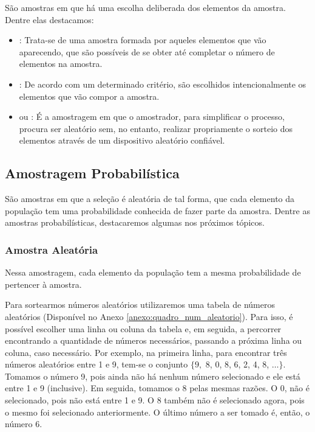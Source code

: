 \documentclass[11pt,fleqn]{book}
\numberwithin{mpicture}{chapter}
\numberwithin{mtable}{chapter}
\numberwithin{mframe}{chapter}
\begin{document}
São amostras em que há uma escolha deliberada dos elementos da amostra. Dentre elas destacamos:
\begin{itemize}
	\item {}: Trata-se de uma amostra formada por aqueles elementos que vão aparecendo, que são possíveis de se obter até completar o número de elementos na amostra.
	
	\item {}: De acordo com um determinado critério, são escolhidos intencionalmente os elementos que vão compor a amostra.
	
	\item {} ou : É a amostragem em que o amostrador, para simplificar o processo, procura ser aleatório sem, no entanto, realizar propriamente o sorteio dos elementos através de um dispositivo aleatório confiável.
\end{itemize}

\subsection{Amostragem Probabilística}

São amostras em que a seleção é aleatória de tal forma, que cada elemento da população tem uma probabilidade conhecida de fazer parte da amostra. Dentre as amostras probabilísticas, destacaremos algumas nos próximos tópicos.

\subsubsection{Amostra Aleatória}

Nessa amostragem, cada elemento da população tem a mesma probabilidade de pertencer à amostra.

Para sortearmos números aleatórios utilizaremos uma tabela de números aleatórios (Disponível no Anexo \ref{anexo:quadro_num_aleatorio}). Para isso, é possível escolher uma linha ou coluna da tabela e, em seguida, a percorrer encontrando a quantidade de números necessários, passando a próxima linha ou coluna, caso necessário. Por exemplo, na primeira linha, para encontrar três números aleatórios entre 1 e 9, tem-se o conjunto $\{9,$ 8, 0, 8, 6, 2, 4, 8, $\dots\}$. Tomamos o número 9, pois ainda não há nenhum número selecionado e ele está entre 1 e 9 (inclusive). Em seguida, tomamos o 8 pelas mesmas razões. O 0, não é selecionado, pois não está entre 1 e 9. O 8 também não é selecionado agora, pois o mesmo foi selecionado anteriormente. O último número a ser tomado é, então, o número 6.
\end{document}
